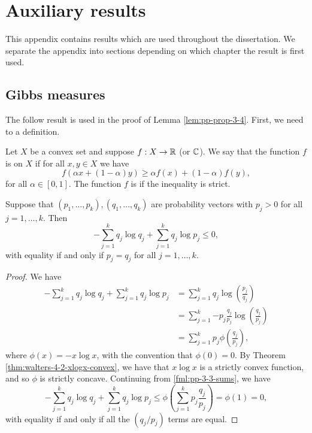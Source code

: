 \chapter{Auxiliary results}
This appendix contains results which are used throughout the dissertation. We separate the appendix into sections depending on which chapter the result is first used.

\section{Gibbs measures}
The follow result is used in the proof of Lemma \ref{lem:pp-prop-3-4}. First, we need to a definition.

\begin{definition}
	Let $X$ be a convex set and suppose $f : X \to \mathbb{R}$ (or $\mathbb{C}$). We say that the function $f$ is  on $X$ if for all $x, y \in X$ we have
	\[
		f(\alpha x + (1 - \alpha)y) \geq \alpha f(x) + (1 - \alpha)f(y),
	\]
	for all $\alpha \in [0, 1]$. The function $f$ is  if the inequality is strict.~\cite[p11]{cambini-martein:generalized}
\end{definition}

\begin{lemma} \label{lem:pp-3-3}
	Suppose that $(p_1, \dots, p_k), (q_1, \dots, q_k)$ are probability vectors with $p_j > 0$ for all $j = 1, \dots, k$. Then
	\[
		-\sum_{j = 1}^k{q_j \log{q_j}} + \sum_{j = 1}^k{q_j \log{p_j}} \leq 0,
	\]
	with equality if and only if $p_j = q_j$ for all $j = 1, \dots, k$.
	\begin{proof}
		We have
		\begin{align}
			-\sum_{j = 1}^k{q_j \log{q_j}} + \sum_{j = 1}^k{q_j \log{p_j}} &= \sum_{j = 1}^k{q_j \log\left(\frac{p_j}{q_j}\right)} \nonumber \\
				&= \sum_{j = 1}^k{-p_j \frac{q_j}{p_j} \log\left(\frac{q_j}{p_j}\right)} \nonumber \\
				&= \sum_{j = 1}^k{p_j \phi\left(\frac{q_j}{p_j}\right)}, \label{fml:pp-3-3-sums}
		\end{align}
		where $\phi(x) = -x \log{x}$, with the convention that $\phi(0) = 0$. By Theorem \ref{thm:walters-4-2-xlogx-convex}, we have that $x \log{x}$ is a strictly convex function, and so $\phi$ is strictly concave. Continuing from \eqref{fml:pp-3-3-sums}, we have
		\[
			-\sum_{j = 1}^k{q_j \log{q_j}} + \sum_{j = 1}^k{q_j \log{p_j}} \leq \phi\left(\sum_{j = 1}^k{p_j \frac{q_j}{p_j}}\right) = \phi(1) = 0,
		\]
		with equality if and only if all the $(q_j / p_j)$ terms are equal.
	\end{proof}
\end{lemma}

